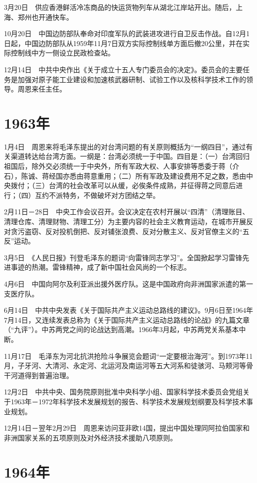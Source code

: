 \documentclass[10pt,a4paper,twocolumn]{book}
\begin{document}
3月20日　供应香港鲜活冷冻商品的快运货物列车从湖北江岸站开出。随后，上海、郑州也开通快车。

10月20日　中国边防部队奉命对印度军队的武装进攻进行自卫反击作战。自12月1日起，中国边防部队从1959年11月7日双方实际控制线单方面后撤20公里，并在实际控制线中方一侧设立民政检查站。

12月14日　中共中央作出《关于成立十五人专门委员会的决定》。委员会的主要任务是加强对原子能工业建设和加速核武器研制、试验工作以及核科学技术工作的领导。周恩来任主任。

\section{1963年}

1月4日　周恩来将毛泽东提出的对台湾问题的有关原则概括为“一纲四目”，通过有关渠道转达给台湾方面。一纲是：台湾必须统一于中国。四目是：（一）台湾回归祖国后，除外交必须统一于中央外，所有军政大权、人事安排等悉委于蒋（介石），陈诚、蒋经国亦悉由蒋意重用；（二）所有军政及建设费用不足之数，悉由中央拨付；（三）台湾的社会改革可以从缓，必俟条件成熟，并征得蒋之同意后进行；（四）互约不派特务，不做破坏对方团结之举。

2月11日－28日　中央工作会议召开。会议决定在农村开展以“四清”（清理账目、清理仓库、清理财物、清理工分）为主要内容的社会主义教育运动，在城市开展反对贪污盗窃、反对投机倒把、反对铺张浪费、反对分散主义、反对官僚主义的“五反”运动。

3月5日　《人民日报》刊登毛泽东的题词“向雷锋同志学习”。全国掀起学习雷锋先进事迹的热潮。雷锋精神，成了新中国社会风尚的一个标志。

4月6日　中国向阿尔及利亚派出援外医疗队。这是中国政府向非洲国家派遣的第一支医疗队。

6月14日　中共中央发表《关于国际共产主义运动总路线的建议》。9月6日至1964年7月14日，又连续发表总称为《关于国际共产主义运动总路线的论战》的九篇文章（“九评”）。中苏两党之间的论战达到高潮。1966年3月起，中苏两党关系基本中断。

11月17日　毛泽东为河北抗洪抢险斗争展览会题词“一定要根治海河”。到1973年11月，子牙河、大清河、永定河、北运河及南运河等五大河系和徒骇河、马颊河等骨干河道得到普遍治理。

12月2日　中共中央、国务院原则批准中央科学小组、国家科学技术委员会党组关于1963年－1972年科学技术发展规划的报告、科学技术发展规划纲要及科学技术事业规划。

12月14日－翌年2月29日　周恩来访问亚非欧14国，提出中国处理同阿拉伯国家和非洲国家关系的五项原则及对外经济技术援助八项原则。

\section{1964年}
\end{document}
